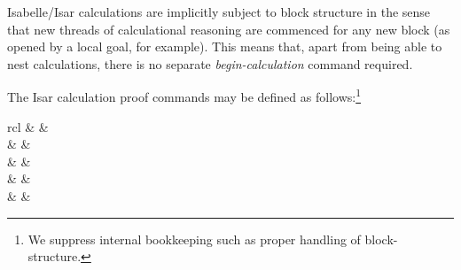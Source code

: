 \begin{isabellebody}
\begin{isamarkuptext}
  Isabelle/Isar calculations are implicitly subject to block structure
  in the sense that new threads of calculational reasoning are
  commenced for any new block (as opened by a local goal, for
  example).  This means that, apart from being able to nest
  calculations, there is no separate \emph{begin-calculation} command
  required.

  \medskip The Isar calculation proof commands may be defined as
  follows:\footnote{We suppress internal bookkeeping such as proper
  handling of block-structure.}

  \begin{matharray}{rcl}
    \hyperlink{command.also}{\mbox{}} & \equiv & \hyperlink{command.note}{\mbox{}}~ \\
    \hyperlink{command.also}{\mbox{}} & \equiv & \hyperlink{command.note}{\mbox{}}~ \\[0.5ex]
    \hyperlink{command.finally}{\mbox{}} & \equiv & \hyperlink{command.also}{\mbox{}}~\hyperlink{command.from}{\mbox{}}~ \\[0.5ex]
    \hyperlink{command.moreover}{\mbox{}} & \equiv & \hyperlink{command.note}{\mbox{}}~ \\
    \hyperlink{command.ultimately}{\mbox{}} & \equiv & \hyperlink{command.moreover}{\mbox{}}~\hyperlink{command.from}{\mbox{}}~ \\
  \end{matharray}


\end{isamarkuptext}
\end{isabellebody}

